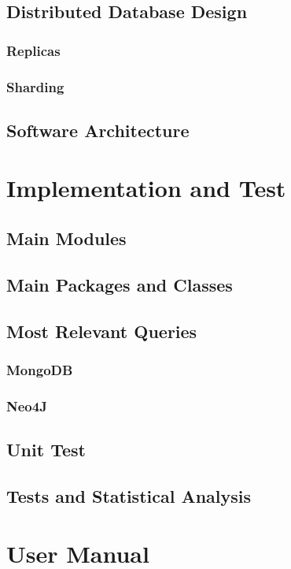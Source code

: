 \documentclass[a4paper]{report}
\begin{document}
\section{Distributed Database Design}
\subsection{Replicas}
\subsection{Sharding}
\section{Software Architecture}


\chapter{Implementation and Test}
\section{Main Modules}
\section{Main Packages and Classes}
\section{Most Relevant Queries}
\subsection{MongoDB}
\subsection{Neo4J}
\section{Unit Test}
\section{Tests and Statistical Analysis}

\chapter{User Manual}
\end{document}
